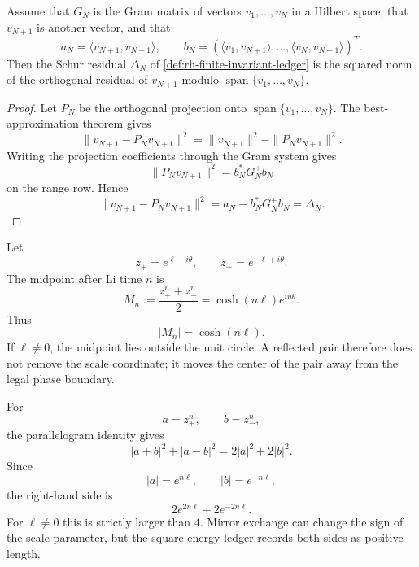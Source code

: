 \begin{theorem}
\label{thm:rh-schur-row-residual-energy}
Assume that $G_N$ is the Gram matrix of vectors
$v_1,\ldots,v_N$ in a Hilbert space, that
$v_{N+1}$ is another vector, and that
$$
a_N=\langle v_{N+1},v_{N+1}\rangle,
\qquad
b_N=(\langle v_1,v_{N+1}\rangle,\ldots,
\langle v_N,v_{N+1}\rangle)^T.
$$
Then the Schur residual $\Delta_N$ of
\autoref{def:rh-finite-invariant-ledger} is the squared norm of the
orthogonal residual of $v_{N+1}$ modulo
$\operatorname{span}\{v_1,\ldots,v_N\}$.
\end{theorem}

\begin{proof}
Let $P_N$ be the orthogonal projection onto
$\operatorname{span}\{v_1,\ldots,v_N\}$.  The best-approximation theorem
gives
$$
\|v_{N+1}-P_Nv_{N+1}\|^2
=
\|v_{N+1}\|^2-\|P_Nv_{N+1}\|^2.
$$
Writing the projection coefficients through the Gram system gives
$$
\|P_Nv_{N+1}\|^2=b_N^\ast G_N^+b_N
$$
on the range row.  Hence
$$
\|v_{N+1}-P_Nv_{N+1}\|^2
=
a_N-b_N^\ast G_N^+b_N
=
\Delta_N.
$$
\end{proof}

\begin{principle}
\label{prin:rh-mirror-midpoint-obstruction}
Let
$$
z_+=e^{\ell+i\theta},
\qquad
z_-=e^{-\ell+i\theta}.
$$
The midpoint after Li time $n$ is
$$
M_n:=\frac{z_+^n+z_-^n}{2}
=
\cosh(n\ell)e^{in\theta}.
$$
Thus
$$
|M_n|=\cosh(n\ell).
$$
If $\ell\ne0$, the midpoint lies outside the unit circle.  A reflected
pair therefore does not remove the scale coordinate; it moves the
center of the pair away from the legal phase boundary.
\end{principle}

\begin{principle}
\label{prin:rh-parallelogram-reflected-scale-obstruction}
For
$$
a=z_+^n,
\qquad
b=z_-^n,
$$
the parallelogram identity gives
$$
|a+b|^2+|a-b|^2=2|a|^2+2|b|^2.
$$
Since
$$
|a|=e^{n\ell},
\qquad
|b|=e^{-n\ell},
$$
the right-hand side is
$$
2e^{2n\ell}+2e^{-2n\ell}.
$$
For $\ell\ne0$ this is strictly larger than $4$.  Mirror exchange can
change the sign of the scale parameter, but the square-energy ledger
records both sides as positive length.
\end{principle}

